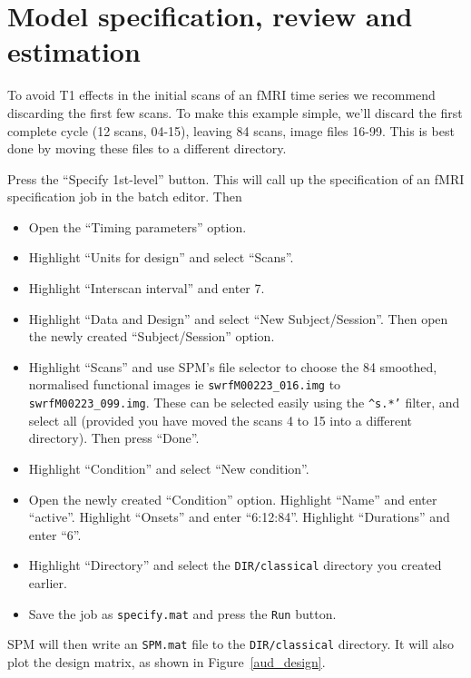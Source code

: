 \section{Model specification, review and estimation}

To avoid T1 effects in the initial scans of an fMRI time series we recommend discarding the first few scans. To make this example simple, we'll discard the first complete cycle (12 scans, 04-15), leaving 84 scans, image files 16-99. This is best done by moving these files to a different directory.

Press the ``Specify 1st-level'' button. This will call up the specification of an fMRI specification job in the batch editor. Then

\begin{itemize}
\item Open the ``Timing parameters'' option.
\item Highlight ``Units for design'' and select ``Scans''.
\item Highlight ``Interscan interval'' and enter 7.
\item Highlight ``Data and Design'' and select ``New Subject/Session''. Then open the newly created ``Subject/Session'' option.
\item Highlight ``Scans'' and use SPM's file selector to choose the 84 smoothed, normalised functional images ie  \texttt{swrfM00223\_016.img} to \texttt{swrfM00223\_099.img}. These can be selected easily using the \texttt{\textasciicircum s.*'} filter, and select all (provided you have moved the scans 4 to 15 into a different directory). Then press ``Done''.
\item Highlight ``Condition'' and select ``New condition''.
\item Open the newly created ``Condition'' option. Highlight ``Name'' and enter ``active''. Highlight ``Onsets'' and enter ``6:12:84''. Highlight ``Durations'' and enter ``6''.
\item Highlight ``Directory'' and select the \texttt{DIR/classical} directory you created earlier.
\item Save the job as \texttt{specify.mat} and press the \texttt{Run} button.
\end{itemize}

SPM will then write an \texttt{SPM.mat} file to the \texttt{DIR/classical} directory. It will also plot the design matrix, as shown in Figure~\ref{aud_design}. 

